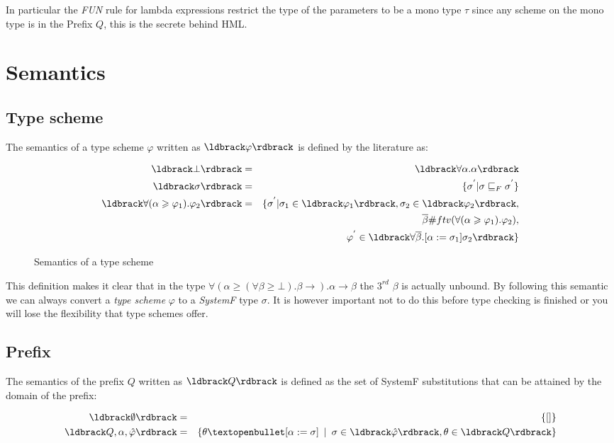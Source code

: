 \documentclass[twoside, titlepage, openright, a4paper]{book}
\renewcommand{\geq}{\geqslant}
\newcommand{\br}[1]{\ldbrack #1 \rdbrack}
\begin{document}
In particular the \textit{FUN} rule for lambda expressions restrict the type of the parameters to be a mono type $\tau$ since any scheme on the mono type is in the Prefix $Q$, this is the secrete behind HML.
\section{Semantics}
\subsection{Type scheme}
The semantics of a type scheme $\varphi$ written as $\br{\varphi}$  is defined by the literature as:
\begin{figure}[H]
\begin{eqnarray*}
\br{\bot} & = & \br{\forall\alpha . \alpha} \\
\br{\sigma} & = & \{ \sigma^{'} | \sigma \sqsubseteq_F \sigma^{'} \} \\
\br{\forall(\alpha \geq \varphi_1).\varphi_2} & = & \{ \sigma^{'} | \sigma_1  \in \br{\varphi_1}, \sigma_2 \in \br{\varphi_2}, \\ 
   &\mbox{   }& \mbox{   } \overline{\beta} \# ftv(\forall(\alpha \geq \varphi_1).\varphi_2), \\
   &\mbox{   }& \mbox{   } \varphi^{'} \in \br{\forall\overline{\beta}.\lbrack \alpha := \sigma_1 \rbrack\sigma_2}  \} 
\end{eqnarray*}
\caption{Semantics of a type scheme}
\end{figure}

This definition makes it clear that in the type $\forall(\alpha \geq (\forall \beta \geq \bot). \beta \rightarrow ). \alpha \rightarrow \beta$ the $3^{rd}$ $\beta$ is actually unbound. By following this semantic we can always convert a \emph{type scheme} $\varphi$ to a \emph{SystemF} type $\sigma$. It is however important not to do this before type checking is finished or you will lose the flexibility that type schemes offer.
\subsection{Prefix}
The semantics of the prefix $Q$ written as $\br{Q}$  is defined as the set of SystemF substitutions that can be attained by the domain of the prefix:

\begin{eqnarray*}
\br{\emptyset} & = & \{\lbrack\rbrack\} \\
\br{Q, \alpha, \hat{\varphi}} & = & \{ \theta \textopenbullet \lbrack \alpha := \sigma \rbrack \hspace{5pt} | \hspace{5pt} \sigma \in \br{\hat{\varphi}}, \theta \in \br{Q} \}
\end{eqnarray*}
\end{document}
